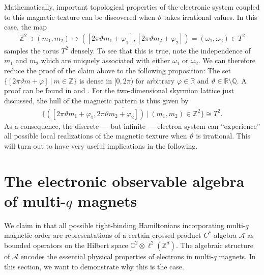 \documentclass[submission, Phys]{SciPost}
\begin{document}
Mathematically, important topological properties of the electronic system coupled to this magnetic texture can be discovered when $\vartheta$ takes irrational values.
In this case, the map
\begin{align}
   \mathbb{Z}^2 \ni (m_1,m_2) \mapsto ( [2\pi \vartheta m_1 + \varphi_1], [2\pi\vartheta m_2 + \varphi_2] ) = (\omega_1, \omega_2) \in T^2
\end{align}
samples the torus $T^2$ densely. 
To see that this is true, note the independence of $m_1$ and $m_2$ which are uniquely associated with either $\omega_1$ or $\omega_2$.
We can therefore reduce the proof of the claim above to the following proposition:
The set $\lbrace [2\pi \vartheta m + \varphi] ~|~ m \in \mathbb{Z}\rbrace$ is dense in $[0,2\pi)$ for arbitrary $\varphi \in \mathbb{R}$ and $\vartheta \in \mathbb{R}\setminus \mathbb{Q}$.
A proof can be found in \cite{Weyl1916} and \cite[Prop. 1.3.3.]{Katok1995}.
For the two-dimensional skyrmion lattice just discussed, the hull of the magnetic pattern is thus given by
\begin{align}
    \overline{
    \lbrace 
        ( [2\pi\vartheta m_1 + \varphi_1, 2\pi \vartheta m_2 + \varphi_2] )
        ~ | ~ (m_1, m_2) \in \mathbb{Z}^2
    \rbrace
    }
    \cong T^2.
\end{align}
As a consequence, the discrete --- but infinite --- electron system can ``experience'' all possible local realizations of the magnetic texture when $\vartheta$ is irrational.
This will turn out to have very useful implications in the following.

\section{The electronic observable algebra of multi-\texorpdfstring{$q$}{q} magnets}
\label{sec:observable_algebra}

We claim in \cite{Lux2024} that all possible tight-binding Hamiltonians incorporating multi-$q$ magnetic order are representations of a certain crossed product $C^\ast$-algebra
$\mathcal{A}$ as bounded operators on the Hilbert space $\mathbb{C}^2 \otimes \ell^2(\mathbb{Z}^d)$.
The algebraic structure of $\mathcal{A}$ encodes the essential physical properties of electrons in multi-$q$ magnets. 
In this section, we want to demonstrate why this is the case.
\end{document}

